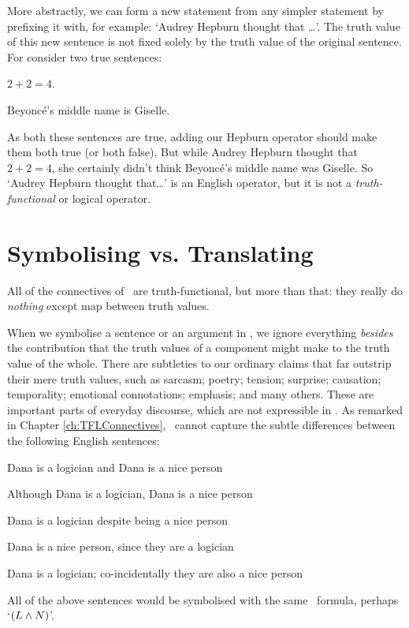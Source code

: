 \documentclass[PHIL101-Textbook.tex]{subfiles}
\begin{document}
More abstractly, we can form a new statement from any simpler statement by prefixing it with, for example: `Audrey Hepburn thought that \ldots'. The truth value of this new sentence is not fixed solely by the truth value of the original sentence. For consider two true sentences:
	\begin{earg}
  \item $2 + 2 = 4$.
  \item Beyonc\'{e}'s middle name is Giselle.
	\end{earg}
As both these sentences are true, adding our Hepburn operator should make them both true (or both false). But while Audrey Hepburn thought that $2+2=4$, she certainly didn't think Beyonc\'{e}'s middle name was Giselle. So `Audrey Hepburn thought that\ldots' is an English operator, but it is not a \emph{truth-functional} or logical operator.


\section{Symbolising vs. Translating}
All of the connectives of \tfl\ are truth-functional, but more than that: they really do \emph{nothing} except map between truth values.  

When we symbolise a sentence or an argument in \tfl, we ignore everything \emph{besides} the contribution that the truth values of a component might make to the truth value of the whole. There are subtleties to our ordinary claims that far outstrip their mere truth values, such as sarcasm; poetry; tension; surprise; causation; temporality; emotional connotations; emphasis; and many others. These are important parts of everyday discourse, which are not expressible in \tfl. As remarked in Chapter \ref{ch:TFLConnectives}, \tfl\ cannot capture the subtle differences between the following English sentences:
	\begin{earg}
  \item Dana is a logician and Dana is a nice person
  \item Although Dana is a logician, Dana is a nice person
  \item Dana is a logician despite being a nice person
  \item Dana is a nice person, since they are a logician
  \item Dana is a logician; co-incidentally they are also a nice person
	\end{earg}
All of the above sentences would be symbolised with the same \tfl\ formula, perhaps `$(L \land N)$'.
\end{document}
